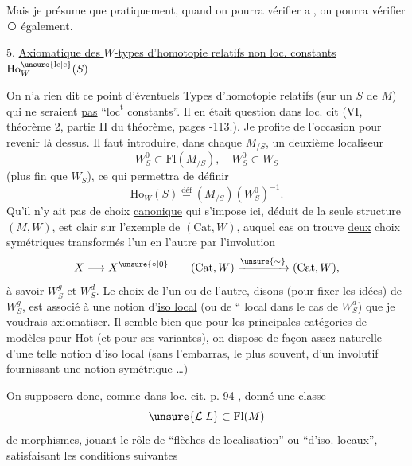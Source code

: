 Mais je présume que pratiquement, quand on pourra vérifier \textcircled{a}, on pourra vérifier \textcircled{} également.

5. \uline{Axiomatique des $W$-types d'homotopie relatifs non loc. constants} $\mathrm{Ho}^{\unsure{\mathrm{lc}|\mathrm{c}}}_{W}(S)$

On n'a rien dit  ce point d'éventuels Types d'homotopie relatifs (sur un  $S$ de $M$) qui ne seraient \uline{pas} ``$\mathrm{loc}^{\mathrm{t}}$ constants''. Il en était question  dans loc. cit (VI, théorème  2, partie II du théorème\unsure{)}, pages -113.). Je profite de l'occasion pour revenir là dessus. Il faut introduire, dans chaque $M_{/S}$, un deuxième localiseur
\[
W_S^0\subset\mathrm{Fl}(M_{/S}),\quad W_S^0\subset W_S
\]
(plus fin que $W_S$), ce qui permettra de définir
\[
\mathrm{Ho}_W(S)\overset{\text{déf}}{=}(M_{/S})(W_S^0)^{-1}.
\]
Qu'il n'y ait pas de choix \uline{canonique} qui s'impose ici, déduit de la seule structure $(M,W)$, est clair sur l'exemple de $(\mathrm{Cat},W)$, auquel cas on trouve \uline{deux} choix symétriques transformés l'un en l'autre par l'involution
\[
X\longrightarrow X^{\unsure{\circ|0}}\qquad(\mathrm{Cat},W)\xrightarrow{\unsure{\sim}}(\mathrm{Cat},W),
\]
à savoir $W_S^g$ et $W_S^d$. Le choix de l'un ou de l'autre, disons (pour fixer les idées) de $W_S^g$, est associé à une notion d'\uline{iso local} (ou de `` local dans le cas de $W_S^d$) que je voudrais axiomatiser. Il semble bien que pour les principales catégories de modèles pour $\mathrm{Hot}$ (et pour ses variantes), on dispose de façon assez naturelle d'une telle notion d'iso local (sans l'embarras, le plus souvent, d'un  involutif fournissant une notion symétrique \ldots)

On supposera donc, comme dans loc. cit. p. 94-, donné une classe
\[
\unsure{\mathcal L|L}\subset\mathrm{Fl}(M)
\]
de morphismes, jouant le rôle de ``flèches de
localisation'' ou ``d'iso. locaux'', satisfaisant les conditions suivantes


